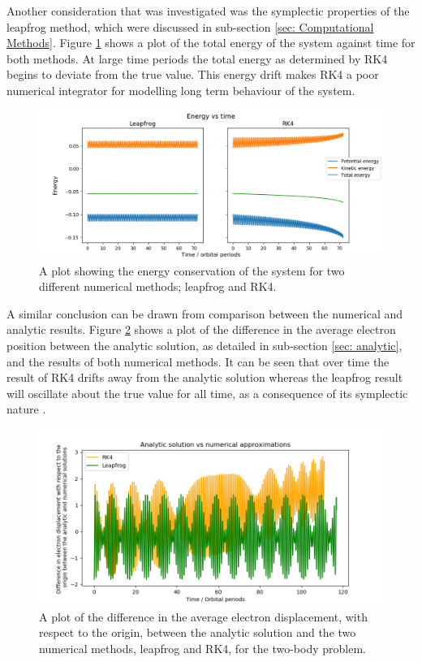 \documentclass[12pt]{article} %
\numberwithin{equation}{subsection} %
\begin{document}
Another consideration that was investigated was the symplectic properties of the leapfrog method, which were discussed in sub-section \ref{sec: Computational Methods}. Figure \ref{fig: energy comparison} shows a plot of the total energy of the system against time for both methods. At large time periods the total energy as determined by RK4 begins to deviate from the true value. This energy drift makes RK4 a poor numerical integrator for modelling long term behaviour of the system.
\begin{figure}[h]
    \centering
    \captionsetup{justification=centering}
	\includegraphics[scale=0.45]{images/energyComparison3.png}
	\caption{A plot showing the energy conservation of the system for two different numerical methods; leapfrog and RK4.}
	\label{fig: energy comparison}
	\end{figure}
A similar conclusion can be drawn from comparison between the numerical and analytic results. Figure \ref{fig: ana vs numeric} shows a plot of the difference in the average electron position between the analytic solution, as detailed in sub-section \ref{sec: analytic}, and the results of both numerical methods. It can be seen that over time the result of RK4 drifts away from the analytic solution whereas the leapfrog result will oscillate about the true value for all time, as a consequence of its symplectic nature \cite[p; 11]{young2014leapfrog}. \par
\begin{figure}[h]
    \centering
    \captionsetup{justification=centering}
	\includegraphics[scale=0.45]{images/anavsLeapvsRK4v4.png}
	\caption{A plot of the difference in the average electron displacement, with respect to the origin, between the analytic solution and the two numerical methods, leapfrog and RK4, for the two-body problem.}
	\label{fig: ana vs numeric}
	\end{figure}
\end{document}
